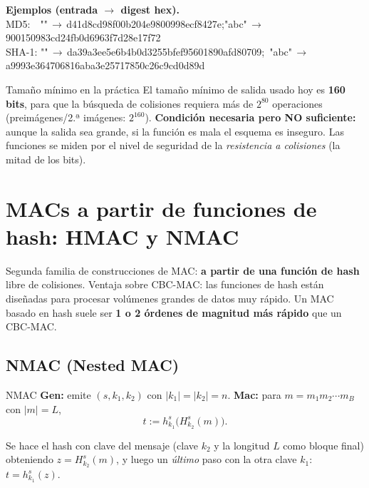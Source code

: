 \documentclass[11pt,a4paper]{article}
\begin{document}
\begin{slidebox}
\textbf{Ejemplos (entrada $\to$ digest hex).}\\[2pt]
{\footnotesize\ttfamily
MD5:\ \ ""\,$\to$\,d41d8cd98f00b204e9800998ecf8427e;\quad "abc"\,$\to$\,900150983cd24fb0d6963f7d28e17f72\\
SHA-1: ""\,$\to$\,da39a3ee5e6b4b0d3255bfef95601890afd80709;\ "abc"\,$\to$\,a9993e364706816aba3e25717850c26c9cd0d89d}
\end{slidebox}

\begin{warnbox}{Tamaño mínimo en la práctica}
El tamaño mínimo de salida usado hoy es \textbf{160 bits}, para que la búsqueda de colisiones
requiera más de $2^{80}$ operaciones (preimágenes/2.ª imágenes: $2^{160}$).
\textbf{Condición necesaria pero NO suficiente:} aunque la salida sea grande, si la función
es mala el esquema es inseguro. Las funciones se miden por el nivel de seguridad de la
\emph{resistencia a colisiones} (la mitad de los bits).
\end{warnbox}

\section{MACs a partir de funciones de hash: HMAC y NMAC}

Segunda familia de construcciones de MAC: \textbf{a partir de una función de hash} libre de
colisiones. Ventaja sobre CBC-MAC: las funciones de hash están diseñadas para procesar
volúmenes grandes de datos muy rápido. Un MAC basado en hash suele ser \textbf{1 o 2 órdenes
de magnitud más rápido} que un CBC-MAC.

\subsection{NMAC (Nested MAC)}
\begin{defbox}{NMAC}
\textbf{Gen:} emite $(s,k_1,k_2)$ con $|k_1|=|k_2|=n$.\quad
\textbf{Mac:} para $m=m_1m_2\cdots m_B$ con $|m|=L$,
\[
  t := h^s_{k_1}\bigl(H^s_{k_2}(m)\bigr).
\]
\end{defbox}
Se hace el hash con clave del mensaje (clave $k_2$ y la longitud $L$ como bloque final)
obteniendo $z=H^s_{k_2}(m)$, y luego un \emph{último} paso con la otra clave $k_1$:
$t=h^s_{k_1}(z)$.
\end{document}
